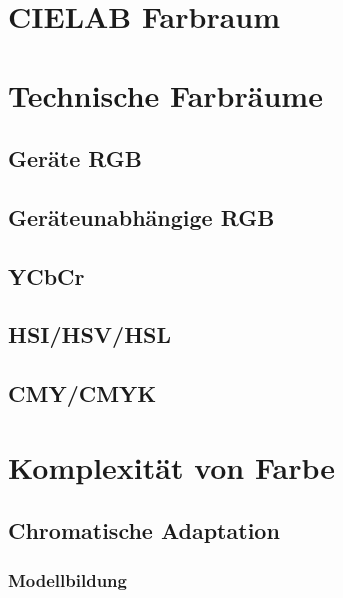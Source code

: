 \documentclass[a4paper, 11pt, accentcolor = tud3b]{tudreport}
\begin{document}
		\section{CIELAB Farbraum} %

		\section{Technische Farbräume} %

			\subsection{Geräte RGB} %

			\subsection{Geräteunabhängige RGB} %

			\subsection{YCbCr} %

			\subsection{HSI/HSV/HSL} %

			\subsection{CMY/CMYK} %

		\section{Komplexität von Farbe} %

			\subsection{Chromatische Adaptation} %

				\subsubsection{Modellbildung} %
\end{document}
